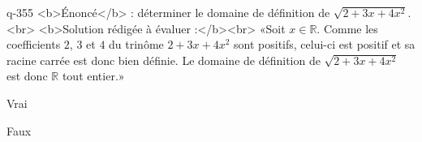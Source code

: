 \begin{truefalse}{q-355}
<b>Énoncé</b> : déterminer le domaine de définition de $\sqrt{2+3x+4x^2}$.<br> <b>Solution rédigée à évaluer :</b><br>  «Soit $x\in\mathbb{R}$. Comme les coefficients $2$, $3$ et $4$ du trinôme $2+3x+4x^2$ sont positifs, celui-ci est positif et sa racine carrée est donc bien définie. Le domaine de définition de $\sqrt{2+3x+4x^2}$ est donc $\mathbb{R}$ tout entier.»
\item Vrai
\item* Faux
\end{truefalse}

